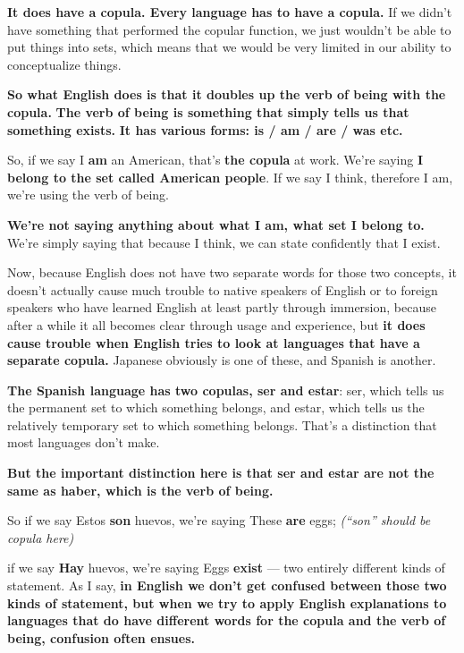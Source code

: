 {\bf It does have a copula. Every language has to have a copula.} If we didn't have something that performed the copular function, we just wouldn't be able to put things into sets, which means that we would be very limited in our ability to conceptualize things.

{\bf So what English does is that it doubles up the verb of being with the copula.} {\bf The verb of being is something that simply tells us that something exists.} {\bf It has various forms: is / am / are / was etc.}

{}

So, if we say I {\bf am} an American, that's {\bf the copula} at work. We're saying {\bf I belong to the set called American people}. If we say I think, therefore I am, we're using the verb of being.

{\bf We're not saying anything about what I am, what set I belong to.} We're simply saying that because I think, we can state confidently that I exist.

Now, because English does not have two separate words for those two concepts, it doesn't actually cause much trouble to native speakers of English or to foreign speakers who have learned English at least partly through immersion, because after a while it all becomes clear through usage and experience, but {\bf it does cause trouble when English tries to look at languages that have a separate copula.} Japanese obviously is one of these, and Spanish is another.

\thinrule

{\bf The Spanish language has two copulas, ser and estar}: ser, which tells us the permanent set to which something belongs, and estar, which tells us the relatively temporary set to which something belongs. That's a distinction that most languages don't make.

{\bf But the important distinction here is that ser and estar are not the same as haber, which is the verb of being.}

{}

So if we say Estos {\bf son} huevos, we're saying These {\bf are} eggs; {\em (“son” should be copula here)}

{}

if we say {\bf Hay} huevos, we're saying Eggs {\bf exist} --- two entirely different kinds of statement. As I say, {\bf in English we don't get confused between those two kinds of statement, but when we try to apply English explanations to languages that do have different words for the copula and the verb of being, confusion often ensues.}

